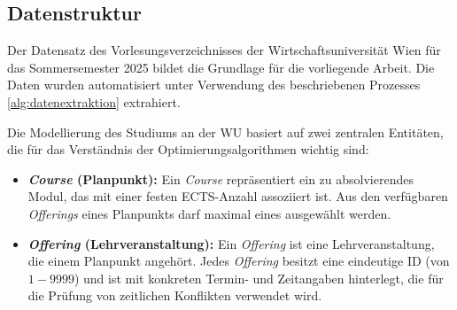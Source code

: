 \subsection{Datenstruktur}\label{chap:datenstruktur}

Der Datensatz des Vorlesungsverzeichnisses der Wirtschaftsuniversität Wien für das Sommersemester 2025 bildet die Grundlage für die vorliegende Arbeit. Die Daten wurden automatisiert unter Verwendung des beschriebenen Prozesses \ref{alg:datenextraktion} extrahiert.

Die Modellierung des Studiums an der WU basiert auf zwei zentralen Entitäten, die für das Verständnis der Optimierungsalgorithmen wichtig sind:

\begin{itemize}
  \item \textbf{\textit{Course} (Planpunkt):} Ein \textit{Course} repräsentiert ein zu absolvierendes Modul, das mit einer festen ECTS-Anzahl assoziiert ist. Aus den verfügbaren \textit{Offerings} eines Planpunkts darf maximal eines ausgewählt werden.
  \item \textbf{\textit{Offering} (Lehrveranstaltung): } Ein \textit{Offering} ist eine Lehrveranstaltung, die einem Planpunkt angehört. Jedes \textit{Offering} besitzt eine eindeutige ID (von $1 - 9999$) und ist mit konkreten Termin- und Zeitangaben hinterlegt, die für die Prüfung von zeitlichen Konflikten verwendet wird.
\end{itemize}

